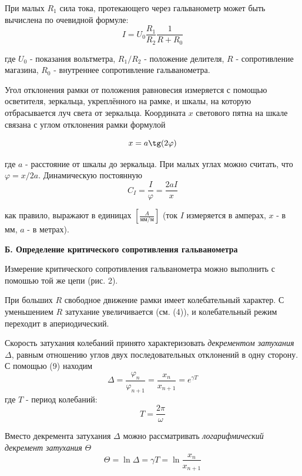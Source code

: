 \documentclass[14pt]{article}
\begin{document}
При малых $R_1$ сила тока, протекающего через гальванометр может быть вычислена по очевидной формуле:
\begin{equation}
	I = U_0\frac{R_1}{R_2}\frac{1}{R + R_0}
\end{equation}

где $U_0$ - показания вольтметра, $R_1/R_2$ - положение делителя, $R$ - сопротивление магазина, $R_0$ - внутреннее сопротивление гальванометра.

Угол отклонения рамки от положения равновесия измеряется с помощью осветителя, зеркальца, укреплённого на рамке, и шкалы, на которую отбрасывается луч света от зеркальца. Координата $x$ светового пятна на шкале связана с углом отклонения рамки формулой

$$
	x = a\tg(2\varphi)
$$

где $a$ - расстояние от шкалы до зеркальца. При малых углах можно считать, что $\varphi = x/2a$. Динамическую постоянную
\begin{equation}
	C_I = \frac{I}{\varphi} = \frac{2aI}{x}
\end{equation}

как правило, выражают в единицах $\left[\frac{A}{\text{мм}/\text{м}}\right]$ (ток $I$ измеряется в амперах, $x$ - в мм, $a$ - в метрах).

\vspace{1cm}
\textbf{Б. Определение критического сопротивления гальванометра}

Измерение критического сопротивления гальванометра можно выполнить с помошью той же цепи (рис. 2).

При больших $R$ свободное движение рамки имеет колебательный характер. С уменьшением $R$ затухание увеличивается (см. (4)), и колебательный режим переходит в апериодический.

Скорость затухания колебаний принято характеризовать \textsl{декрементом затухания} $\Delta$, равным отношению углов двух последовательных отклонений в одну сторону. С помощью (9) находим
$$
	\Delta = \frac{\varphi_n}{\varphi_{n+1}} = \frac{x_n}{x_{n+1}} = e^{\gamma T}
$$
где $T$ - период колебаний:
\begin{equation}
	T = \frac{2\pi}{\omega}
\end{equation}

Вместо декремента затухания $\Delta$ можно рассматривать \textsl{логарифмический декремент затухания} $\Theta$
\begin{equation}
	\Theta = \ln\Delta = \gamma T = \ln\frac{x_n}{x_{n+1}}
\end{equation}
\end{document}
